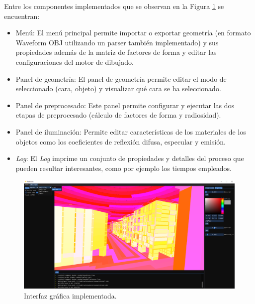 Entre los componentes implementados que se observan en la Figura \ref{img:ui-ex} se encuentran:

\begin{itemize}
	\item Menú: El menú principal permite importar o exportar geometría (en formato Waveform OBJ utilizando un parser también implementado) y sus propiedades además de la matriz de factores de forma y editar las configuraciones del motor de dibujado.
	\item Panel de geometría: El panel de geometría permite editar el modo de seleccionado (cara, objeto) y visualizar qué cara se ha seleccionado.
	\item Panel de preprocesado: Este panel permite configurar y ejecutar las dos etapas de preprocesado (cálculo de factores de forma y radiosidad).
	\item Panel de iluminación: Permite editar características de los materiales de los objetos como los coeficientes de reflexión difusa, especular y emisión.
	\item \textit{Log}: El \textit{Log} imprime un conjunto de propiedades y detalles del proceso que pueden resultar interesantes, como por ejemplo los tiempos empleados.
\end{itemize}

\begin{figure}[htbp!]
	\centering
	\includegraphics[width=1\linewidth]{assets/ui-ex}
	\caption{Interfaz gráfica implementada.}
	\label{img:ui-ex}
\end{figure}